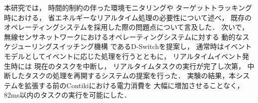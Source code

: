 本研究では，
時間的制約の伴った環境モニタリングや
ターゲットトラッキング時における，
省エネルギーなリアルタイム処理の必要性について述べ，
既存のオペレーティングシステムを採用した際の問題点について言及した．
次いで，
無線センサネットワークにおけるオペレーティングシステムに対する
動的なスケジューリングスイッチング機構
であるD-Switchを提案し，
通常時はイベントモデルとしてイベントに応じた処理を行うとともに，
リアルタイムイベント発生時には
現在のタスクを中断し，
リアルタイムタスクの実行が完了し次第，
中断したタスクの処理を再開するシステムの提案を行った．
実験の結果，本システムを拡張する前のContikiにおける電力消費を
大幅に増加させることなく，
82ms以内のタスクの実行を可能にした．



